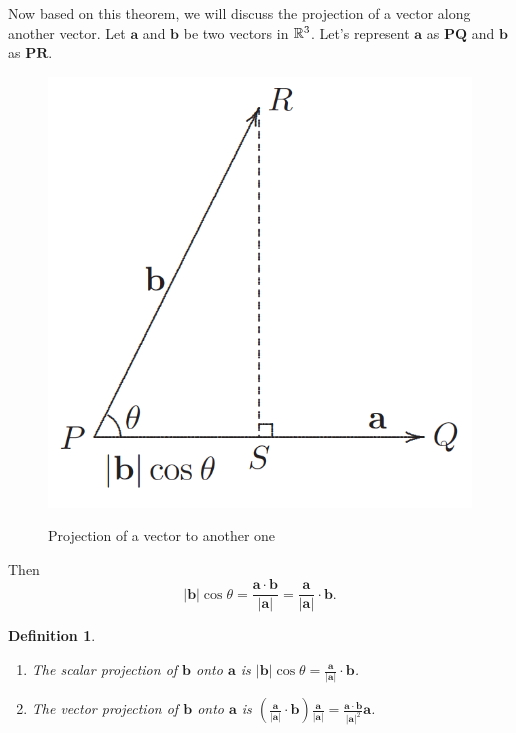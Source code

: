 \documentclass[12pt]{article}
\newtheorem{defn}{Definition}[section]
\begin{document}
Now based on this theorem, we will discuss the projection of a vector along another vector.
Let $\pmb{a}$ and $\pmb{b}$ be two vectors in $\R^3$. Let's represent $\pmb{a}$ as 
$\pmb{PQ}$ and $\pmb{b}$ as $\pmb{PR}$.

\begin{center}
  \begin{figure}[h]
    \centering
    \includegraphics[width=\linewidth/4]{figures/fig6.png}
    \label{fig:6}
    \caption{Projection of a vector to another one}
  \end{figure}
\end{center}

Then
$$ |\pmb{b}| \cos \theta = \frac{\pmb{a} \cdot \pmb{b}}{| \pmb{a} |} = \frac{\pmb{a}}{|\pmb{a}|} \cdot \pmb{b} .$$

\begin{defn}
  \begin{enumerate} Let $\pmb{a}$ and $\pmb{b}$ be two vectors in $\R^3$.
    \item The scalar projection of $\pmb{b}$ onto $\pmb{a}$ is $|\pmb{b}|\cos \theta = \frac{\pmb{a}}{|\pmb{a}|} \cdot \pmb{b}$.
    \item The vector projection of $\pmb{b}$ onto $\pmb{a}$ is 
    $ \left( \frac{\pmb{a}}{ |\pmb{a}| } \cdot \pmb{b} \right) \frac{\pmb{a}}{|\pmb{a}|} 
     = \frac{ \pmb{a} \cdot \pmb{b} }{|\pmb{a}|^2}\pmb{a}$.
  \end{enumerate}
\end{defn}
\end{document}
